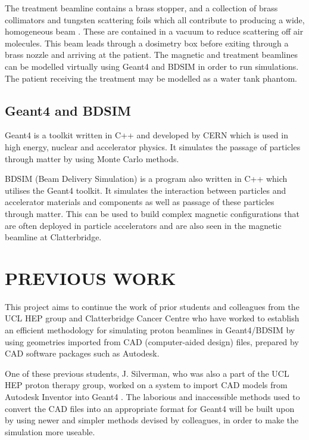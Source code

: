 \documentclass[a4paper, 12pt, conference]
{ieeeconf}      %
\begin{document}
The treatment beamline contains a brass stopper, and a collection of brass collimators and tungsten scattering foils which all contribute to producing a wide, homogeneous beam \cite{hep}. These are contained in a vacuum to reduce scattering off air molecules. This beam leads through a dosimetry box before exiting through a brass nozzle and arriving at the patient. The magnetic and treatment beamlines can be modelled virtually using Geant4 and BDSIM in order to run simulations. The patient receiving the treatment may be modelled as a water tank phantom.

\subsection{Geant4 and BDSIM}
Geant4 is a toolkit written in C++ and developed by CERN which is used in high energy, nuclear and accelerator physics. It simulates the passage of particles through matter by using Monte Carlo methods. 

BDSIM (Beam Delivery Simulation) is a program also written in C++ which utilises the Geant4 toolkit. It simulates the interaction between particles and accelerator materials and components as well as passage of these particles through matter. This can be used to build complex magnetic configurations that are often deployed in particle accelerators and are also seen in the magnetic beamline at Clatterbridge.




\section{PREVIOUS WORK}

This project aims to continue the work of prior students and colleagues from the UCL HEP group and Clatterbridge Cancer Centre who have worked to establish an efficient methodology for simulating proton beamlines in Geant4/BDSIM by using geometries imported from CAD (computer-aided design) files, prepared by CAD software packages such as Autodesk.

One of these previous students, J. Silverman, who was also a part of the UCL HEP proton therapy group, worked on a system to import CAD models from Autodesk Inventor into Geant4 \cite{silverman}. The laborious and inaccessible methods used to convert the CAD files into an appropriate format for Geant4 will be built upon by using newer and simpler methods devised by colleagues, in order to make the simulation more useable.
\end{document}
